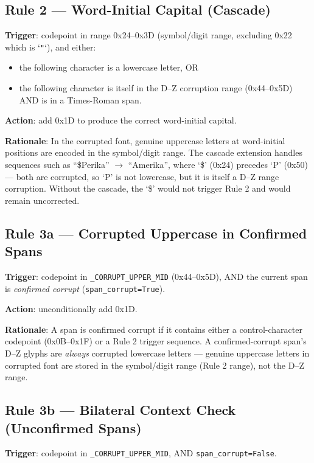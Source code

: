 \documentclass[12pt, a4paper]{report}
\newcommand{\codeinline}[1]{\texttt{#1}}
\begin{document}
\subsection{Rule 2 — Word-Initial Capital (Cascade)}

\textbf{Trigger}: codepoint in range 0x24--0x3D (symbol/digit range, excluding
0x22 which is `\texttt{"}`), and either:
\begin{itemize}[noitemsep]
  \item the following character is a lowercase letter, OR
  \item the following character is itself in the D--Z corruption range
        (0x44--0x5D) AND is in a Times-Roman span.
\end{itemize}

\textbf{Action}: add 0x1D to produce the correct word-initial capital.

\textbf{Rationale}: In the corrupted font, genuine uppercase letters at
word-initial positions are encoded in the symbol/digit range. The cascade
extension handles sequences such as ``\$Perika'' $\to$ ``Amerika'', where
`\$' (0x24) precedes `P' (0x50) — both are corrupted, so `P' is not lowercase,
but it is itself a D--Z range corruption. Without the cascade, the `\$' would
not trigger Rule 2 and would remain uncorrected.

\subsection{Rule 3a — Corrupted Uppercase in Confirmed Spans}

\textbf{Trigger}: codepoint in \codeinline{\_CORRUPT\_UPPER\_MID}
(0x44--0x5D), AND the current span is \emph{confirmed corrupt}
(\codeinline{span\_corrupt=True}).

\textbf{Action}: unconditionally add 0x1D.

\textbf{Rationale}: A span is confirmed corrupt if it contains either a
control-character codepoint (0x0B--0x1F) or a Rule 2 trigger sequence. A
confirmed-corrupt span's D--Z glyphs are \emph{always} corrupted lowercase
letters — genuine uppercase letters in corrupted font are stored in the
symbol/digit range (Rule 2 range), not the D--Z range.

\subsection{Rule 3b — Bilateral Context Check (Unconfirmed Spans)}

\textbf{Trigger}: codepoint in \codeinline{\_CORRUPT\_UPPER\_MID},
AND \codeinline{span\_corrupt=False}.
\end{document}
